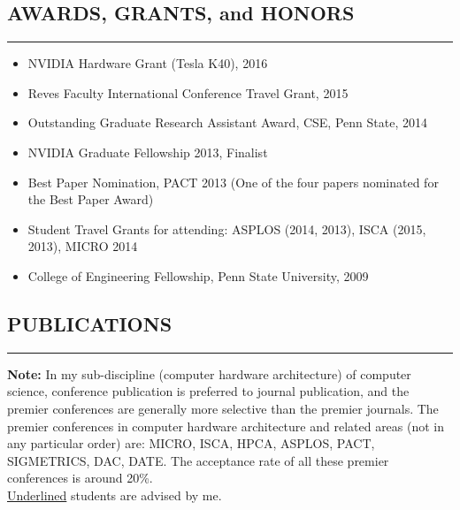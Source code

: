 \documentclass[10pt,a4]{article}
\begin{document}
\subsection*{AWARDS, GRANTS, and HONORS}
\hrule
\vspace{0.2cm}
\begin{itemize}
\item  NVIDIA Hardware Grant (Tesla K40), 2016 
\item  Reves Faculty International Conference Travel Grant, 2015 
\item  Outstanding Graduate Research Assistant Award, CSE, Penn State, 2014 
\item  NVIDIA Graduate Fellowship 2013, Finalist 
\item  Best Paper Nomination, PACT 2013 (One of the four papers nominated for the Best Paper Award) 
\item  Student Travel Grants for attending: ASPLOS (2014, 2013), ISCA (2015, 2013), MICRO 2014 
\item  College of Engineering Fellowship, Penn State University, 2009 
\end{itemize}

\subsection*{PUBLICATIONS}
\hrule
\vspace{0.2cm}
{\bf Note:} In my sub-discipline (computer hardware architecture) of computer science, conference publication 
is preferred to journal publication, and the premier conferences are generally more selective than the premier journals. 
The premier conferences in computer hardware architecture and related areas (not in any particular order)
are: MICRO, ISCA, HPCA, ASPLOS, PACT, SIGMETRICS, DAC, DATE. The
acceptance rate of all these premier conferences is around 20\%. \\
 
\underline{Underlined} students are advised by me. %
\end{document}
